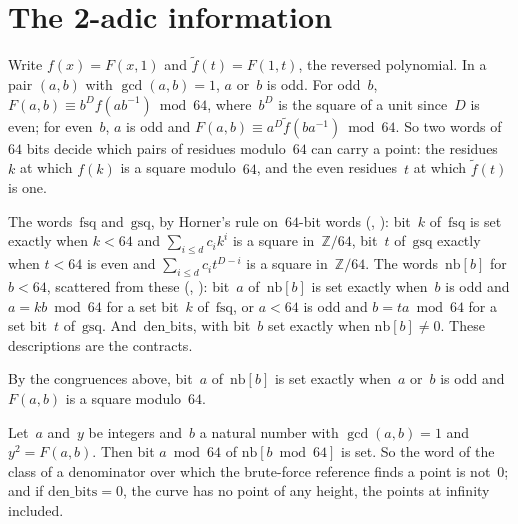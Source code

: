 \section{The 2-adic information}\label{sec:twoAdic}

Write $f(x) = F(x, 1)$ and $\tilde f(t) = F(1, t)$, the reversed polynomial. In a pair $(a, b)$
with $\gcd(a, b) = 1$, $a$ or~$b$ is odd. For odd~$b$, $F(a, b) \equiv b^D f(a b^{-1}) \bmod 64$,
where~$b^D$ is the square of a unit since~$D$ is even; for even~$b$, $a$ is odd and
$F(a, b) \equiv a^D \tilde f(b a^{-1}) \bmod 64$. So two words of~$64$ bits decide which pairs of
residues modulo~$64$ can carry a point: the residues~$k$ at which $f(k)$ is a square modulo~$64$,
and the even residues~$t$ at which $\tilde f(t)$ is one.

\begin{definition}\label{def:twoAdic}
  \leanok
  The words~$\mathrm{fsq}$ and~$\mathrm{gsq}$, by Horner's rule on~$64$-bit words
  (, ): bit~$k$
  of~$\mathrm{fsq}$ is set exactly when $k < 64$ and $\sum_{i \le d} c_i k^i$ is a square
  in~$\mathbb{Z}/64$, bit~$t$ of~$\mathrm{gsq}$ exactly when $t < 64$ is even and
  $\sum_{i \le d} c_i t^{D - i}$ is a square in~$\mathbb{Z}/64$. The words~$\mathrm{nb}[b]$ for
  $b < 64$, scattered from these (,
  ): bit~$a$ of~$\mathrm{nb}[b]$ is set exactly when~$b$ is odd
  and $a = k b \bmod 64$ for a set bit~$k$ of~$\mathrm{fsq}$, or $a < 64$ is odd and
  $b = t a \bmod 64$ for a set bit~$t$ of~$\mathrm{gsq}$. And~$\mathrm{den\_bits}$, with bit~$b$
  set exactly when $\mathrm{nb}[b] \ne 0$. These descriptions are the contracts.
\end{definition}

By the congruences above, bit~$a$ of~$\mathrm{nb}[b]$ is set exactly when~$a$ or~$b$ is odd and
$F(a, b)$ is a square modulo~$64$.

\begin{lemma}\label{lem:twoAdic_point}
  \leanok
  Let~$a$ and~$y$ be integers and~$b$ a natural number with $\gcd(a, b) = 1$ and $y^2 = F(a, b)$.
  Then bit $a \bmod 64$ of $\mathrm{nb}[b \bmod 64]$ is set. So the word of the class of a
  denominator over which the brute-force reference finds a point is not~$0$; and if
  $\mathrm{den\_bits} = 0$, the curve has no point of any height, the points at infinity included.
\end{lemma}

